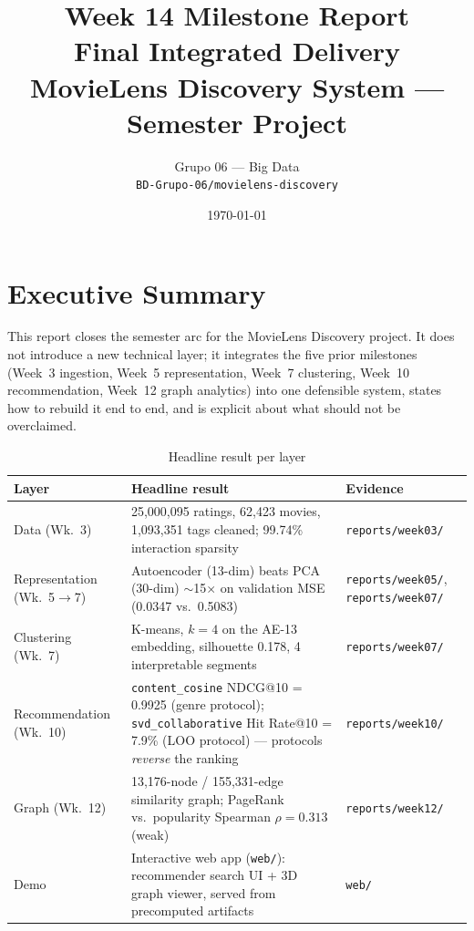 \documentclass[12pt,a4paper]{article}
\title{
  \vspace{-1cm}
  \Large\textbf{Week 14 Milestone Report}\\[0.4em]
  \large Final Integrated Delivery\\[0.3em]
  \normalsize MovieLens Discovery System --- Semester Project
}
\author{
  Grupo 06 --- Big Data\\
  \texttt{BD-Grupo-06/movielens-discovery}
}
\date{\today}
\begin{document}

\maketitle
\thispagestyle{fancy}
\tableofcontents
\newpage

\section{Executive Summary}

This report closes the semester arc for the MovieLens Discovery project. It does not introduce a
new technical layer; it integrates the five prior milestones (Week~3 ingestion, Week~5
representation, Week~7 clustering, Week~10 recommendation, Week~12 graph analytics) into one
defensible system, states how to rebuild it end to end, and is explicit about what should not be
overclaimed.

\begin{table}[H]
\centering
\caption{Headline result per layer}
\begin{tabular}{p{2.6cm}p{7.6cm}p{2.4cm}}
\toprule
\textbf{Layer} & \textbf{Headline result} & \textbf{Evidence} \\
\midrule
Data (Wk.~3) & 25,000,095 ratings, 62,423 movies, 1,093,351 tags cleaned; 99.74\% interaction sparsity & \texttt{reports/week03/} \\
Representation (Wk.~5$\to$7) & Autoencoder (13-dim) beats PCA (30-dim) $\sim$15$\times$ on validation MSE (0.0347 vs.\ 0.5083) & \texttt{reports/week05/}, \texttt{reports/week07/} \\
Clustering (Wk.~7) & K-means, $k=4$ on the AE-13 embedding, silhouette 0.178, 4 interpretable segments & \texttt{reports/week07/} \\
Recommendation (Wk.~10) & \texttt{content\_cosine} NDCG@10 = 0.9925 (genre protocol); \texttt{svd\_collaborative} Hit Rate@10 = 7.9\% (LOO protocol) --- protocols \emph{reverse} the ranking & \texttt{reports/week10/} \\
Graph (Wk.~12) & 13,176-node / 155,331-edge similarity graph; PageRank vs.\ popularity Spearman $\rho=0.313$ (weak) & \texttt{reports/week12/} \\
Demo & Interactive web app (\texttt{web/}): recommender search UI + 3D graph viewer, served from precomputed artifacts & \texttt{web/} \\
\bottomrule
\end{tabular}
\end{table}
\end{document}
